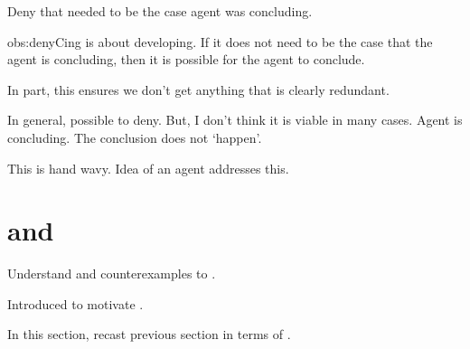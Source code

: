 \begin{note}
  \begin{observation}
    \label{obs:denyCing}
    Deny that needed to be the case agent was concluding.
  \end{observation}

  \begin{motivation}{obs:denyCing}
    \qWhyV{} is about developing.
    If it does not need to be the case that the agent is concluding, then it is possible for the agent to conclude.
  \end{motivation}

  In part, this ensures we don't get anything that is clearly redundant.

  In general, possible to deny.
  But, I don't think it is viable in many cases.
  Agent is concluding.
  The conclusion does not `happen'.

  This is hand wavy.
  Idea of an agent \tCV{} addresses this.
\end{note}

\section{ and \issueConstraint{}}
\label{sec:tpyically-concluding}

\begin{note}
  Understand \requ{} and counterexamples to \issueConstraint{}.

  Introduced \tCV{} to motivate \requ{}.

  In this section, recast previous section in terms of \tCV{}.
\end{note}

\subsection{}
\label{cha:binding:tCon}


